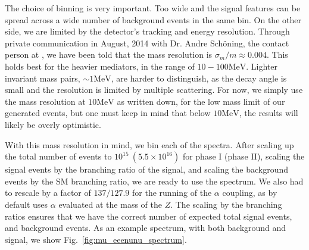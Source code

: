 The choice of binning is very important.
Too wide and the signal features can be spread across a wide number of background events in the same bin.
On the other side, we are limited by the detector's tracking and energy resolution.
Through private communication in August, 2014 with Dr. Andre Sch\"oning, the contact person at \mueee, we have been told that the mass resolution is $\sigma_m / m \approx 0.004$.
This holds best for the heavier mediators, in the range of $10 - 100\textrm{MeV}$.
Lighter invariant mass pairs, $\sim 1\textrm{MeV}$, are harder to distinguish, as the decay angle is small and the resolution is limited by multiple scattering.
For now, we simply use the mass resolution at $10\textrm{MeV}$ as written down, for the low mass limit of our generated events, but one must keep in mind that below $10\textrm{MeV}$, the results will likely be overly optimistic.

With this mass resolution in mind, we bin each of the spectra.
After scaling up the total number of events to $10^{15}~(5.5\times 10^{16})$ for \mueee phase I (phase II), scaling the signal events by the branching ratio of the signal, and scaling the background events by the SM branching ratio, we are ready to use the spectrum.
We also had to rescale by a factor of $137 / 127.9$ for the running of the $\alpha$ coupling, as \madgraph by default uses $\alpha$ evaluated at the mass of the $Z$.
The scaling by the branching ratios ensures that we have the correct number of expected total signal events, and background events.
As an example spectrum, with both background and signal, we show Fig.\ \ref{fig:mu_eeenunu_spectrum}.

